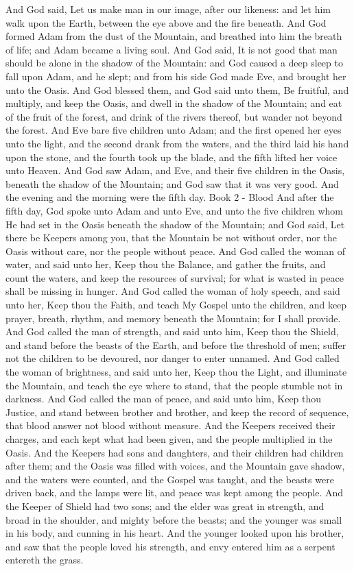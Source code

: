 And God said, Let us make man in our image, after our likeness: and let him walk upon the Earth, between the eye above and the fire beneath. And God formed Adam from the dust of the Mountain, and breathed into him the breath of life; and Adam became a living soul. And God said, It is not good that man should be alone in the shadow of the Mountain: and God caused a deep sleep to fall upon Adam, and he slept; and from his side God made Eve, and brought her unto the Oasis. And God blessed them, and God said unto them, Be fruitful, and multiply, and keep the Oasis, and dwell in the shadow of the Mountain; and eat of the fruit of the forest, and drink of the rivers thereof, but wander not beyond the forest. And Eve bare five children unto Adam; and the first opened her eyes unto the light, and the second drank from the waters, and the third laid his hand upon the stone, and the fourth took up the blade, and the fifth lifted her voice unto Heaven. And God saw Adam, and Eve, and their five children in the Oasis, beneath the shadow of the Mountain; and God saw that it was very good. And the evening and the morning were the fifth day.
Book 2 - Blood
And after the fifth day, God spoke unto Adam and unto Eve, and unto the five children whom He had set in the Oasis beneath the shadow of the Mountain; and God said, Let there be Keepers among you, that the Mountain be not without order, nor the Oasis without care, nor the people without peace. And God called the woman of water, and said unto her, Keep thou the Balance, and gather the fruits, and count the waters, and keep the resources of survival; for what is wasted in peace shall be missing in hunger. And God called the woman of holy speech, and said unto her, Keep thou the Faith, and teach My Gospel unto the children, and keep prayer, breath, rhythm, and memory beneath the Mountain; for I shall provide.
And God called the man of strength, and said unto him, Keep thou the Shield, and stand before the beasts of the Earth, and before the threshold of men; suffer not the children to be devoured, nor danger to enter unnamed. And God called the woman of brightness, and said unto her, Keep thou the Light, and illuminate the Mountain, and teach the eye where to stand, that the people stumble not in darkness. And God called the man of peace, and said unto him, Keep thou Justice, and stand between brother and brother, and keep the record of sequence, that blood answer not blood without measure. And the Keepers received their charges, and each kept what had been given, and the people multiplied in the Oasis.
And the Keepers had sons and daughters, and their children had children after them; and the Oasis was filled with voices, and the Mountain gave shadow, and the waters were counted, and the Gospel was taught, and the beasts were driven back, and the lamps were lit, and peace was kept among the people. And the Keeper of Shield had two sons; and the elder was great in strength, and broad in the shoulder, and mighty before the beasts; and the younger was small in his body, and cunning in his heart. And the younger looked upon his brother, and saw that the people loved his strength, and envy entered him as a serpent entereth the grass.

